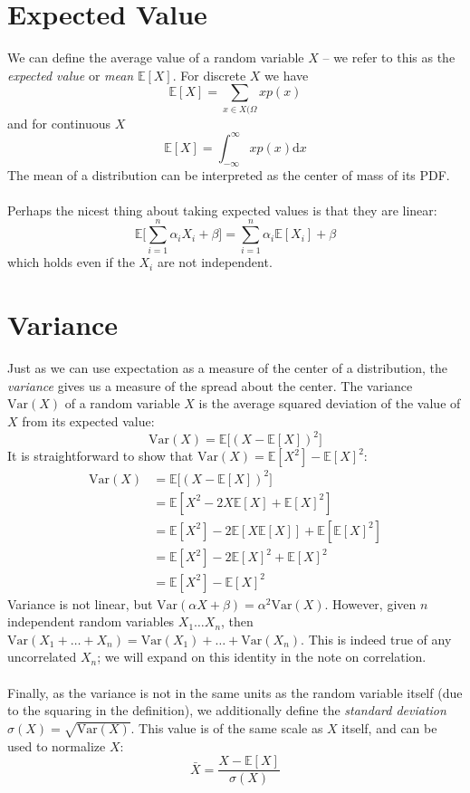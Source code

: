 \documentclass{article}
\begin{document}
\section{Expected Value}
We can define the average value of a random variable $X$ -- we refer to this as the \textit{expected value} or \textit{mean} $\mathbb{E}[X]$. For discrete $X$ we have $$\mathbb{E}[X] = \sum_{x \in X(\Omega} xp(x)$$ and for continuous $X$ $$\mathbb{E}[X] = \int_{-\infty}^\infty xp(x)\text{d}x$$ The mean of a distribution can be interpreted as the center of mass of its PDF. \\\\
Perhaps the nicest thing about taking expected values is that they are linear: $$\mathbb{E}\big[\sum_{i=1}^n \alpha_iX_i + \beta\big] = \sum_{i=1}^n \alpha_i\mathbb{E}[X_i] + \beta$$ which holds even if the $X_i$ are not independent.

\section{Variance}
Just as we can use expectation as a measure of the center of a distribution, the \textit{variance} gives us a measure of the spread about the center. The variance $\text{Var}(X)$ of a random variable $X$ is the average squared deviation of the value of $X$ from its expected value: $$\text{Var}(X) = \mathbb{E}\big[(X - \mathbb{E}[X])^2\big]$$
It is straightforward to show that $\text{Var}(X) = \mathbb{E}[X^2] - \mathbb{E}[X]^2$:
\begin{align*}
\text{Var}(X) &= \mathbb{E}\big[(X - \mathbb{E}[X])^2\big] \\
&= \mathbb{E}[X^2 - 2X\mathbb{E}[X] + \mathbb{E}[X]^2] \\
&= \mathbb{E}[X^2] - 2\mathbb{E}[X\mathbb{E}[X]] + \mathbb{E}[\mathbb{E}[X]^2] \\
&= \mathbb{E}[X^2] - 2\mathbb{E}[X]^2 + \mathbb{E}[X]^2 \\
&= \mathbb{E}[X^2] - \mathbb{E}[X]^2
\end{align*}
Variance is not linear, but $\text{Var}(\alpha X + \beta) = \alpha^2 \text{Var}(X)$. However, given $n$ independent random variables $X_1 \hdots X_n$, then $\text{Var}(X_1 + \hdots + X_n) = \text{Var}(X_1) + \hdots + \text{Var}(X_n)$. This is indeed true of any uncorrelated $X_n$; we will expand on this identity in the note on correlation. \\\\
Finally, as the variance is not in the same units as the random variable itself (due to the squaring in the definition), we additionally define the \textit{standard deviation} $\sigma(X) = \sqrt{\text{Var}(X)}$. This value is of the same scale as $X$ itself, and can be used to normalize $X$: $$\bar{X} = \frac{X - \mathbb{E}[X]}{\sigma(X)}$$
\end{document}
